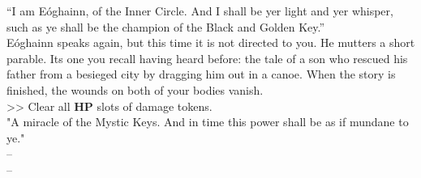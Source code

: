 “I am Eóghainn, of the Inner Circle. And I shall be yer light and yer whisper, such as ye shall be the champion of the Black and Golden Key.”\\

Eóghainn speaks again, but this time it is not directed to you. He mutters a short parable. Its one you recall having heard before: the tale of a son who rescued his father from a besieged city by dragging him out in a canoe. When the story is finished, the wounds on both of your bodies vanish.\\
>> Clear all \textbf{HP} slots of damage tokens.\\

"A miracle of the Mystic Keys. And in time this power shall be as if mundane to ye."\\

 -- \\
 -- 